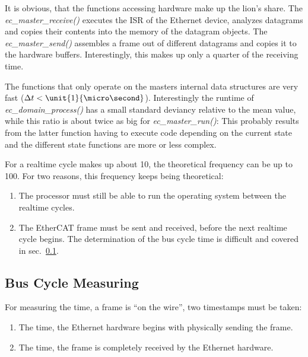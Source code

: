 \documentclass[a4paper,12pt,BCOR6mm,bibtotoc,idxtotoc]{scrbook}
\begin{document}
It is obvious, that the functions accessing hardware make up the
lion's share. The \textit{ec\_master\_receive()} executes the ISR of
the Ethernet device, analyzes datagrams and copies their contents into
the memory of the datagram objects. The \textit{ec\_master\_send()}
assembles a frame out of different datagrams and copies it to the
hardware buffers. Interestingly, this makes up only a quarter of the
receiving time.

The functions that only operate on the masters internal data structures are
very fast ($\Delta t < \unit{1}{\micro\second}$). Interestingly the runtime of
\textit{ec\_domain\_process()} has a small standard deviancy relative to the
mean value, while this ratio is about twice as big for
\textit{ec\_master\_run()}: This probably results from the latter function
having to execute code depending on the current state and the different state
functions are more or less complex.

For a realtime cycle makes up about \unit{10}{\micro\second}, the theoretical
frequency can be up to \unit{100}{\kilo\hertz}. For two reasons, this frequency
keeps being theoretical:

\begin{enumerate}

\item The processor must still be able to run the operating system between the
realtime cycles.

\item The EtherCAT frame must be sent and received, before the next realtime
cycle begins. The determination of the bus cycle time is difficult and covered
in sec.~\ref{sec:timing-bus}.

\end{enumerate}


\subsection{Bus Cycle Measuring}
\label{sec:timing-bus}

For measuring the time, a frame is ``on the wire'', two timestamps must be
taken:

\begin{enumerate}

\item The time, the Ethernet hardware begins with physically sending the
frame.

\item The time, the frame is completely received by the Ethernet hardware.

\end{enumerate}
\end{document}

